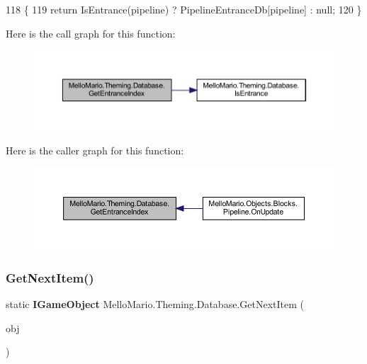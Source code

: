 \begin{DoxyCode}
118         \{
119             \textcolor{keywordflow}{return} IsEntrance(pipeline) ? PipelineEntranceDb[pipeline] : null;
120         \}
\end{DoxyCode}
Here is the call graph for this function\+:
\nopagebreak
\begin{figure}[H]
\begin{center}
\leavevmode
\includegraphics[width=350pt]{classMelloMario_1_1Theming_1_1Database_ae250a55a50ed920475af0873c7494f76_cgraph}
\end{center}
\end{figure}
Here is the caller graph for this function\+:
\nopagebreak
\begin{figure}[H]
\begin{center}
\leavevmode
\includegraphics[width=350pt]{classMelloMario_1_1Theming_1_1Database_ae250a55a50ed920475af0873c7494f76_icgraph}
\end{center}
\end{figure}
\mbox{\label{classMelloMario_1_1Theming_1_1Database_a7b74453e6228a9619d340dfc7572a93a}} 
\subsubsection{Get\+Next\+Item()}
{\footnotesize\ttfamily static \textbf{ I\+Game\+Object} Mello\+Mario.\+Theming.\+Database.\+Get\+Next\+Item (\begin{DoxyParamCaption}\item[{\textbf{ I\+Game\+Object}}]{obj }\end{DoxyParamCaption})\hspace{0.3cm}{\ttfamily [static]}}



